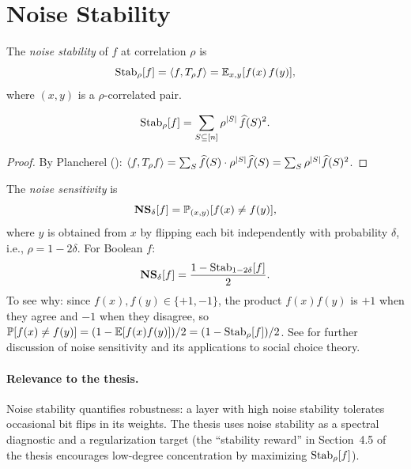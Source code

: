 \section{Noise Stability}\label{sec:noise-stability}

\begin{definition}\label{def:noise-stability}
The \emph{noise stability} of $f$ at correlation $\rho$ is
\begin{equation}\label{eq:stab-def}
  \operatorname{Stab}_\rho[f] = \langle f, T_\rho f \rangle
  = \mathbb{E}_{x,y}[f(x)\, f(y)],
\end{equation}
where $(x,y)$ is a $\rho$-correlated pair.
\end{definition}

\begin{theorem}\label{thm:stab-spectral}
\begin{equation}\label{eq:stab-spectral}
  \operatorname{Stab}_\rho[f] = \sum_{S \subseteq [n]} \rho^{|S|}\, \widehat{f}(S)^2.
\end{equation}
\end{theorem}

\begin{proof}
By Plancherel ():
$\langle f, T_\rho f \rangle = \sum_S \widehat{f}(S) \cdot \rho^{|S|} \widehat{f}(S) = \sum_S \rho^{|S|} \widehat{f}(S)^2$.
\end{proof}

\begin{definition}\label{def:noise-sensitivity}
The \emph{noise sensitivity} is
\[
  \mathbf{NS}_\delta[f] = \mathbb{P}_{(x,y)}[f(x) \neq f(y)],
\]
where $y$ is obtained from $x$ by flipping each bit independently with
probability $\delta$, i.e., $\rho = 1 - 2\delta$. For Boolean $f$:
\[
  \mathbf{NS}_\delta[f] = \frac{1 - \operatorname{Stab}_{1-2\delta}[f]}{2}.
\]
To see why: since $f(x), f(y) \in \{+1,-1\}$, the product $f(x)f(y)$
is $+1$ when they agree and $-1$ when they disagree, so
$\mathbb{P}[f(x) \neq f(y)] = (1 - \mathbb{E}[f(x)f(y)])/2 = (1 - \operatorname{Stab}_\rho[f])/2$.
See \citet[\S2.4]{odonnell2014analysis} for further discussion of noise
sensitivity and its applications to social choice theory.
\end{definition}

\paragraph{Relevance to the thesis.}
Noise stability quantifies robustness: a layer with high noise stability
tolerates occasional bit flips in its weights. The thesis uses noise
stability as a spectral diagnostic and a regularization target (the
``stability reward'' in Section~4.5 of the thesis encourages low-degree
concentration by maximizing $\operatorname{Stab}_\rho[f]$).


